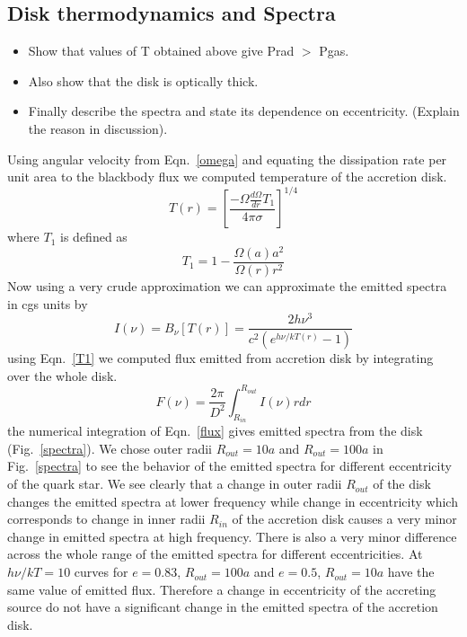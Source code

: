 \documentclass[useAMS,usenatbib]{mn2e}
\begin{document}
\subsection{Disk thermodynamics and Spectra}
\begin{itemize}
\item Show that values of T obtained above give Prad $>$ Pgas. 
\item Also show that the disk is optically thick.
\item Finally describe the spectra and state its dependence on
  eccentricity. (Explain the reason in discussion).
\end{itemize}
Using angular velocity from Eqn.~\ref{omega} and equating the dissipation rate per unit area to the blackbody flux we computed temperature of the accretion disk.
\begin{equation}
T(r) = \left[\frac{-\Omega\frac{d\Omega}{dr}T_1}{4\pi\sigma}\right]^{1/4}
\end{equation}
where $T_1$ is defined as
\begin{equation}
T_1 = 1 - \frac{\Omega(a)a^2}{\Omega(r)r^2}
\label{T1}
\end{equation}
Now using a very crude approximation we can approximate the emitted spectra in cgs units by
\begin{equation}
I(\nu) = B_{\nu}[T(r)] = \frac{2h\nu^3}{c^2(e^{h\nu/kT(r)} -1)}
\end{equation}
using Eqn.~\ref{T1} we computed flux emitted from accretion disk by integrating over the whole disk.
\begin{equation}
F(\nu) = \frac{2\pi}{D^2}\int^{R_{out}}_{R_{in}}I(\nu)rdr
\label{flux}
\end{equation}
the numerical integration of Eqn.~\ref{flux} gives emitted spectra from the disk (Fig.~\ref{spectra}). We chose outer radii $R_{out} = 10a$ and $R_{out} = 100a$ in Fig.~\ref{spectra} to see the behavior of the emitted spectra for different eccentricity of the quark star. We see clearly that a change in outer radii $R_{out}$ of the disk changes the emitted spectra at lower frequency while change in eccentricity which corresponds to change in inner radii $R_{in}$ of the accretion disk causes a very minor change in emitted spectra at high frequency. There is also a very minor difference across the whole range of the emitted spectra for different eccentricities. At $h\nu/kT = 10$ curves for $e = 0.83$, $R_{out} = 100a$ and $e = 0.5$, $R_{out} = 10a$ have the same value of emitted flux. Therefore a change in eccentricity of the accreting source do not have a significant change in the emitted spectra of the accretion disk.
\end{document}
